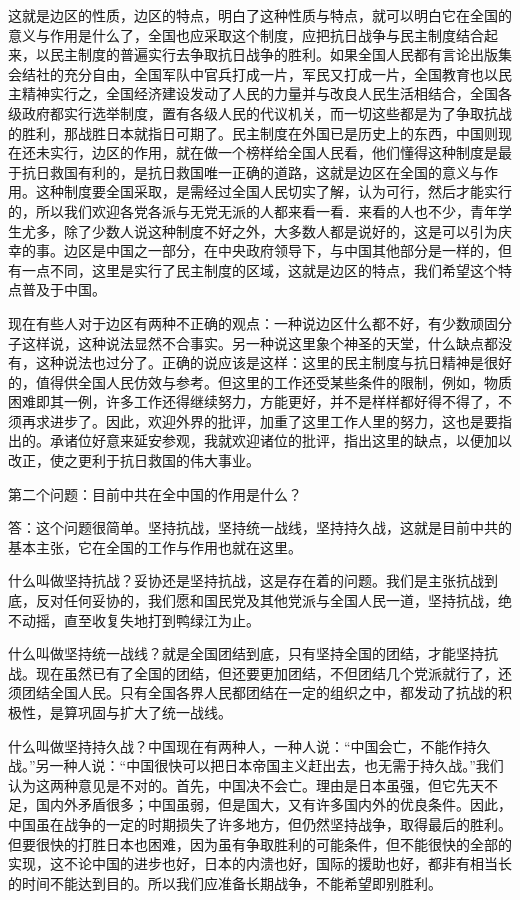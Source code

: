 这就是边区的性质，边区的特点，明白了这种性质与特点，就可以明白它在全国的意义与作用是什么了，全国也应采取这个制度，应把抗日战争与民主制度结合起来，以民主制度的普遍实行去争取抗日战争的胜利。如果全国人民都有言论出版集会结社的充分自由，全国军队中官兵打成一片，军民又打成一片，全国教育也以民主精神实行之，全国经济建设发动了人民的力量并与改良人民生活相结合，全国各级政府都实行选举制度，置有各级人民的代议机关，而一切这些都是为了争取抗战的胜利，那战胜日本就指日可期了。民主制度在外国已是历史上的东西，中国则现在还未实行，边区的作用，就在做一个榜样给全国人民看，他们懂得这种制度是最于抗日救国有利的，是抗日救国唯一正确的道路，这就是边区在全国的意义与作用。这种制度要全国采取，是需经过全国人民切实了解，认为可行，然后才能实行的，所以我们欢迎各党各派与无党无派的人都来看一看．来看的人也不少，青年学生尤多，除了少数人说这种制度不好之外，大多数人都是说好的，这是可以引为庆幸的事。边区是中国之一部分，在中央政府领导下，与中国其他部分是一样的，但有一点不同，这里是实行了民主制度的区域，这就是边区的特点，我们希望这个特点普及于中国。

现在有些人对于边区有两种不正确的观点：一种说边区什么都不好，有少数顽固分子这样说，这种说法显然不合事实。另一种说这里象个神圣的天堂，什么缺点都没有，这种说法也过分了。正确的说应该是这样：这里的民主制度与抗日精神是很好的，值得供全国人民仿效与参考。但这里的工作还受某些条件的限制，例如，物质困难即其一例，许多工作还得继续努力，方能更好，并不是样样都好得不得了，不须再求进步了。因此，欢迎外界的批评，加重了这里工作人里的努力，这也是要指出的。承诸位好意来延安参观，我就欢迎诸位的批评，指出这里的缺点，以便加以改正，使之更利于抗日救国的伟大事业。

第二个问题：目前中共在全中国的作用是什么？

答：这个问题很简单。坚持抗战，坚持统一战线，坚持持久战，这就是目前中共的基本主张，它在全国的工作与作用也就在这里。

什么叫做坚持抗战？妥协还是坚持抗战，这是存在着的问题。我们是主张抗战到底，反对任何妥协的，我们愿和国民党及其他党派与全国人民一道，坚持抗战，绝不动摇，直至收复失地打到鸭绿江为止。

什么叫做坚持统一战线？就是全国团结到底，只有坚持全国的团结，才能坚持抗战。现在虽然已有了全国的团结，但还要更加团结，不但团结几个党派就行了，还须团结全国人民。只有全国各界人民都团结在一定的组织之中，都发动了抗战的积极性，是算巩固与扩大了统一战线。

什么叫做坚持持久战？中国现在有两种人，一种人说：“中国会亡，不能作持久战。”另一种人说：“中国很快可以把日本帝国主义赶出去，也无需于持久战。”我们认为这两种意见是不对的。首先，中国决不会亡。理由是日本虽强，但它先天不足，国内外矛盾很多；中国虽弱，但是国大，又有许多国内外的优良条件。因此，中国虽在战争的一定的时期损失了许多地方，但仍然坚持战争，取得最后的胜利。但要很快的打胜日本也困难，因为虽有争取胜利的可能条件，但不能很快的全部的实现，这不论中国的进步也好，日本的内溃也好，国际的援助也好，都非有相当长的时间不能达到目的。所以我们应准备长期战争，不能希望即别胜利。


